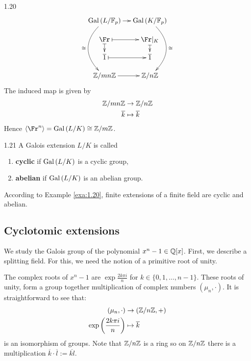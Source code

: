 \documentclass[twoside = false,	%
		headsepline,		%
		parskip = true,
		]{scrbook}						%
\begin{document}
\begin{example}{}{1.20}
    	\begin{equation*}
    	    \xymatrix@R=0.4cm @C=0.4cm
    	    {
    	        \Gal{L/\F_p}\ar[r]\ar@/_2pc/[ddd]_{\cong} & \Gal{K/\F_p}\ar@/^2pc/[ddd]^{\cong} \\
    			\Fr\ar@{|->}[r] \ar@{|->}[d] & \Fr|_K\ar@{|->}[d] \\
    			\overline{1}\ar@{|->}[r] & \overline{1} \\
    			\Z/mn\Z\ar[r] & \Z/n\Z
    	    }
    	\end{equation*}
    	The induced map is given by
    	\begin{equation*}
    	    \begin{split}
    	        \mathbb Z/mn\mathbb Z &\rightarrow \mathbb Z/n\mathbb Z \\
    	       \overline{k} &\mapsto \overline{k}
    	    \end{split}
    	\end{equation*}
    	Hence $\spitz{\Fr^n} = \Gal{L/K} \cong \Z/m\Z$.
    	\end{example}
    	
    	\begin{definition}{}{1.21}
    		A Galois extension $L/K$ is called
    		\begin{enumerate}
    			\item \textbf{cyclic} if $\mathrm{Gal}\left( L/K\right)$ is a cyclic group,
    			\item \textbf{abelian} if $\mathrm{Gal}\left( L/K\right)$ is an abelian group.
    		\end{enumerate}
    	\end{definition}
    
    	According to Example \ref{exa:1.20}, finite extensions of a finite field are cyclic and abelian.
        
    \subsection{Cyclotomic extensions}
        We study the Galois group of the polynomial $x^n-1 \in \mathbb Q[x]$. First, we describe a splitting field. For this, we need the notion of a primitive root of unity.
        
        The complex roots of $x^n -1 $ are $\exp{\frac{2 k \pi i}{n}}$ for $k \in \{0,1,\dots,n-1\}$. These roots of unity, form a group together multiplication of complex numbers $(\mu_n,\cdot)$. It is straightforward to see that:
        \begin{equation*}
            \begin{split}
                (\mu_n,\cdot) &\rightarrow (\mathbb Z/n\mathbb Z,+) \\
                    \mathrm{exp}\left(\frac{2 k \pi i}{n}\right) &\mapsto \overline{k}
            \end{split}
        \end{equation*}
        is an isomorphism of groups. Note that $\mathbb Z/n\mathbb Z$ is a ring so on $\mathbb Z/n\mathbb Z$ there is a multiplication $\overline{k} \cdot \overline{l}:= \overline{kl}$.
        
\end{document}
